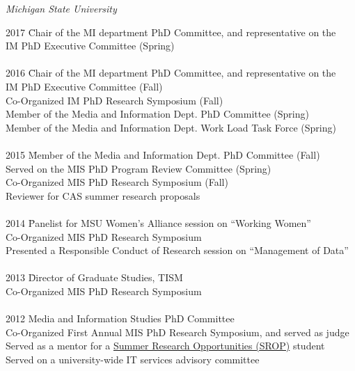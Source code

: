 \documentclass[9pt]{extarticle}
\begin{document}
\emph{Michigan State University} \\
\vspace{1pt}
\begin{tabbing}
2017 \hspace{0.3in}\= Chair of the MI department PhD Committee, and representative on the \\
\> \hspace{0.5cm} IM PhD Executive Committee (Spring) \\\\

2016 \hspace{0.3in}\= Chair of the MI department PhD Committee, and representative on the \\
\> \hspace{0.5cm} IM PhD Executive Committee (Fall) \\
\> Co-Organized IM PhD Research Symposium (Fall) \\ %
\> Member of the Media and Information Dept. PhD Committee (Spring) \\ 
\> Member of the Media and Information Dept. Work Load Task Force (Spring) \\\\

2015 \hspace{0.3in}\=  Member of the Media and Information Dept. PhD Committee (Fall) \\ %
\> Served on the MIS PhD Program Review Committee (Spring) \\ %
\> Co-Organized MIS PhD Research Symposium (Fall) \\ %
\> Reviewer for CAS summer research proposals \\\\ %

2014 \hspace{0.3in}\=  Panelist for MSU Women's Alliance session on ``Working Women'' \\ %
\> Co-Organized MIS PhD Research Symposium \\ %
\> Presented a Responsible Conduct of Research session on ``Management of Data'' \\\\ %

2013 \hspace{0.3in}\=  Director of Graduate Studies, TISM \\
\> Co-Organized MIS PhD Research Symposium \\\\ 

2012 \>  Media and Information Studies PhD Committee \\
\> Co-Organized First Annual MIS PhD Research Symposium, and served as judge \\ %
\> Served as a mentor for a \href{https://grad.msu.edu/srop}{Summer Research Opportunities (SROP)} student \\ %
\> Served on a university-wide IT services advisory committee \\ %
\end{tabbing}
\end{document}
